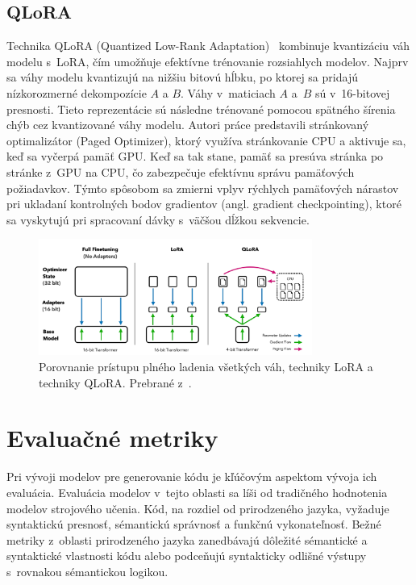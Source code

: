 \subsection{QLoRA}

Technika QLoRA (Quantized Low-Rank Adaptation)~\cite{dettmers2023qlora} kombinuje kvantizáciu váh modelu s~LoRA, čím umožňuje efektívne trénovanie rozsiahlych modelov. Najprv sa váhy modelu kvantizujú na nižšiu bitovú hĺbku, po ktorej sa pridajú nízkorozmerné dekompozície $A$ a $B$. Váhy v~maticiach $A$ a~$B$ sú v~16-bitovej presnosti. Tieto reprezentácie sú následne trénované pomocou spätného šírenia chýb cez kvantizované váhy modelu. Autori práce predstavili stránkovaný optimalizátor (Paged Optimizer), ktorý využíva stránkovanie CPU a aktivuje sa, keď sa vyčerpá pamäť GPU. Keď sa tak stane, pamäť sa presúva stránka po stránke z~GPU na CPU, čo zabezpečuje efektívnu správu pamäťových požiadavkov. Týmto spôsobom sa zmierni vplyv rýchlych pamäťových nárastov pri ukladaní kontrolných bodov gradientov (angl. gradient checkpointing), ktoré sa vyskytujú pri spracovaní dávky s~väčšou dĺžkou sekvencie.

\begin{figure}
    \centering
    \includegraphics[width=0.8\textwidth]{obrazky/QLoRA.png}
    \caption{Porovnanie prístupu plného ladenia všetkých váh, techniky LoRA a techniky QLoRA. Prebrané z~\cite{dettmers2023qlora}.}
    \label{fig:qlora}
\end{figure}

\section{Evaluačné metriky}

Pri vývoji modelov pre generovanie kódu je kľúčovým aspektom vývoja ich evaluácia. Evaluácia modelov v~tejto oblasti sa líši od tradičného hodnotenia modelov strojového učenia. Kód, na rozdiel od prirodzeného jazyka, vyžaduje syntaktickú presnosť, sémantickú správnosť a funkčnú vykonateľnosť. Bežné metriky z~oblasti prirodzeného jazyka zanedbávajú dôležité sémantické a syntaktické vlastnosti kódu alebo podceňujú syntakticky odlišné výstupy s~rovnakou sémantickou logikou.

